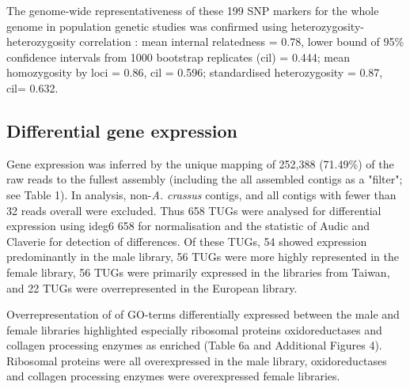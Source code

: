 \documentclass[10pt]{bmc_article}
\newenvironment{bmcformat}{\begin{raggedright}\baselineskip20pt\sloppy\setboolean{publ}{false}}{\end{raggedright}\baselineskip20pt\sloppy}
\begin{document}
\begin{bmcformat}
The genome-wide representativeness of these 199 SNP
markers for the whole genome in population genetic studies was
confirmed using heterozygosity-heterozygosity correlation
\cite{pmid21565077}: mean internal relatedness = 0.78, lower bound of
95\% confidence intervals from 1000 bootstrap replicates (cil) =
0.444; mean homozygosity by loci = 0.86, cil = 0.596; standardised
heterozygosity = 0.87, cil= 0.632.

 \subsection*{Differential gene expression}
                





Gene expression was inferred by the unique mapping of 252,388
(71.49\%) of the raw reads to the fullest assembly (including the all
assembled contigs as a "filter"; see Table 1). In analysis,
non-\textit{A. crassus} contigs, and all contigs with fewer than 32
reads overall were excluded. Thus 658 TUGs were analysed for
differential expression using ideg6 658 for
normalisation and the statistic of Audic and Claverie
\cite{pmid9331369} for detection of differences. Of these TUGs, 54
showed expression predominantly in the male library, 56 TUGs were more
highly represented in the female library, 56 TUGs were primarily
expressed in the libraries from Taiwan, and 22 TUGs were
overrepresented in the European library.

Overrepresentation of of GO-terms differentially expressed between the
male and female libraries highlighted especially ribosomal proteins
oxidoreductases and collagen processing enzymes as enriched (Table 6a
and Additional Figures 4). Ribosomal proteins were all overexpressed
in the male library, oxidoreductases and collagen processing enzymes
were overexpressed female libraries.


\end{bmcformat}
\end{document}
